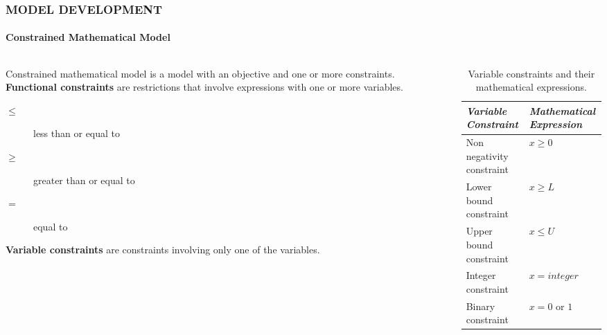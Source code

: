 \documentclass[14 pt]{beamer}
\begin{document}
\begin{frame}[t]
\frametitle{MODEL DEVELOPMENT}
\framesubtitle{Constrained Mathematical Model}

\begin{columns}[t]
\begin{column}{0.45\textwidth}
Constrained mathematical model is a model with an objective and one or more constraints.
\vskip0.5cm%
\textbf{Functional constraints} are restrictions that involve expressions with one or more variables.

\begin{description}
  \item [$\leq$] less than or equal to
  \item [$\geq$] greater than or equal to
  \item [$=$] equal to
\end{description}

\textbf{Variable constraints} are constraints involving only one of the variables.
\end{column}

\begin{column}{0.45\textwidth}
\begin{table}
\begin{tabular}{p{}p{}}
  \emph{Variable Constraint} & \emph{Mathematical Expression} \\
  \hline
  Non negativity constraint & $x \geq 0$ \\
  Lower bound constraint & $x \geq L$ \\
  Upper bound constraint & $x \leq U$ \\
  Integer constraint & $x = integer$ \\
  Binary constraint & $x = 0$ or $1$ \\
  \hline
\end{tabular}
\caption{Variable constraints and their mathematical expressions.}
\end{table}
\end{column}

\end{columns}
\end{frame}

\end{document}
